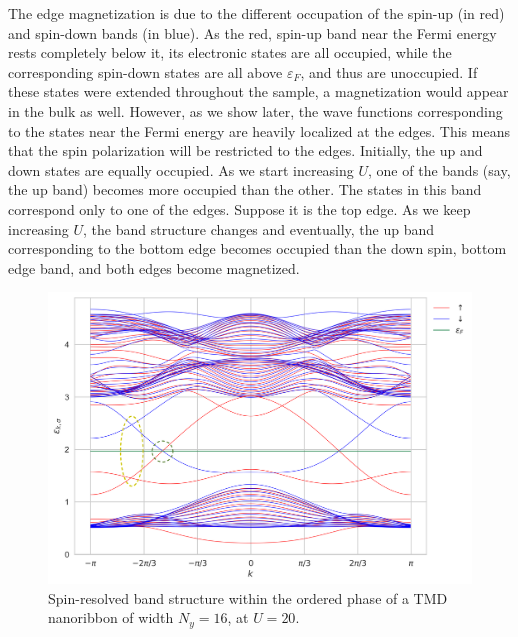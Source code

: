 The edge magnetization is due to the different occupation of the spin-up (in red) and spin-down bands (in blue).
As the red, spin-up band near the Fermi energy rests completely below it, its electronic states are all occupied, while the corresponding spin-down states are all above $\varepsilon_F$, and thus are unoccupied.
If these states were extended throughout the sample, a magnetization would appear in the bulk as well.
However, as we show later, the wave functions corresponding to the states near the Fermi energy are heavily localized at the edges.
This means that the spin polarization will be restricted to the edges.
Initially, the up and down states are equally occupied.
As we start increasing $U$, one of the bands (say, the up band) becomes more occupied than the other.
The states in this band correspond only to one of the edges.
Suppose it is the top edge.
As we keep increasing $U$, the band structure changes and eventually, the up band corresponding to the bottom edge becomes occupied than the down spin, bottom edge band, and both edges become magnetized.
\begin{figure}[H]
\centering
    \includegraphics[scale = 0.42]{images/bands_Nx=512.png}
  \caption{Spin-resolved band structure within the ordered phase of a TMD nanoribbon of width $N_y = 16$, at $U = 20$.}
  \label{fig:bandsU20}
\end{figure}

